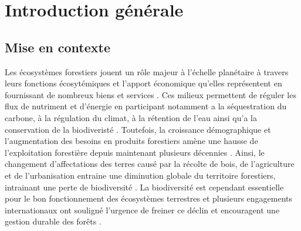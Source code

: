 \chapter*{Introduction générale}         %
\label{chap-introduction}       %


\section*{Mise en contexte}
\label{sec:contexte}

Les écosystèmes forestiers jouent un rôle majeur à l’échelle planétaire à travers leurs fonctions écosytémiques et l'apport économique qu’elles représentent en fournissant de nombreux biens et services \citep{Balvanera2006Quantifyingevidence}. 
Ces milieux permettent de réguler les flux de nutriment et d’énergie en participant notamment a la séquestration du carbone, à la régulation du climat, à la rétention de l’eau ainsi qu’a la conservation de la biodiveristé \citep{Balvanera2006Quantifyingevidence,Diaz2006BiodiversityLoss,Canadell2008Managingforests,Pawson2013Plantationforests}. 
Toutefois, la croissance démographique et l’augmentation des besoins en produits forestiers amène une hausse de l’exploitation forestière depuis maintenant plusieurs décennies \citep{Foley2005GlobalConsequences}. 
Ainsi, le changement d’affectations des terres causé par la récolte de bois, de l’agriculture et de l’urbanisation entraine une diminution globale du territoire forestiers, intrainant une perte de biodiversité \citep{Bengtsson2000Biodiversitydisturbances,Sala2000Globalbiodiversity,Naeem2012functionsbiological,Bichet2016Maintaininganimal}. 
La biodiversité est cependant essentielle pour le bon fonctionnement des écosystèmes terrestres et plusieurs engagements internationaux ont souligné l'urgence de freiner ce déclin et encouragent une gestion durable des forêts \citep{Scherer-Lorenzen2005ForestDiversity,Parviainen2007Maintenanceconservation,Newbold2015Globaleffects}. 

